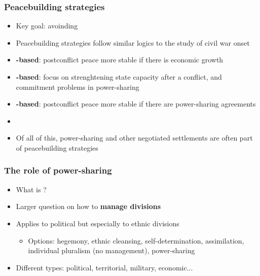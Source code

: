 \documentclass[aspectratio=43]{beamer}
\begin{document}
\begin{frame}
\frametitle{Peacebuilding strategies}
\centering

\begin{itemize}
  \item Key goal: avoinding 
  \item Peacebuilding strategies follow similar logics to the study of civil war onset
  \item<2->[1.] \textbf{{\color{red}{Greed}}-based}: postconflict peace more stable if there is economic growth
  \item<3->[2.] \textbf{{\color{red}{Opportunity}}-based}: focus on strenghtening state capacity after a conflict, and commitment problems in power-sharing
  \item<4->[3.] \textbf{{\color{red}{Grievance}}-based}: postconflict peace more stable if there are power-sharing agreements
  \item<4->[]
  \item<4-> Of all of this, power-sharing and other negotiated settlements are often part of peacebuilding strategies
\end{itemize}

\end{frame}

\begin{frame}
\frametitle{The role of power-sharing}
\centering

\begin{itemize}[<+->]
  \item What is ?
  \item Larger question on how to \textbf{manage divisions}
  \item Applies to political but especially to ethnic divisions
  \begin{itemize}
    \item Options: hegemony, ethnic cleansing, self-determination, assimilation, individual pluralism (no management), power-sharing
  \end{itemize}
  \item Different types: political, territorial, military, economic...
\end{itemize}

\end{frame}
\end{document}
